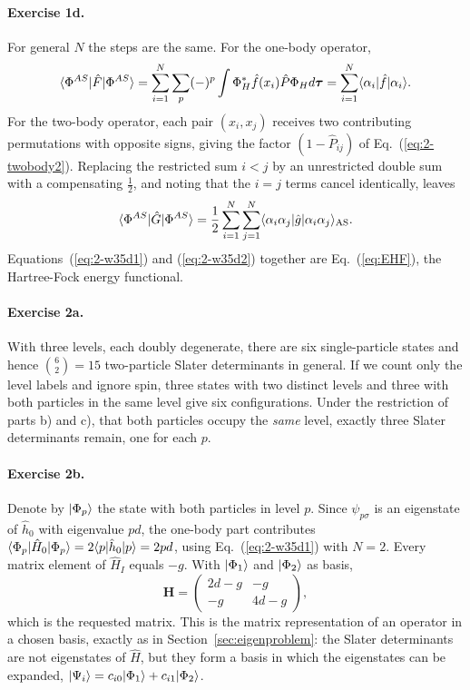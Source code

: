 \paragraph{Exercise 1d.}
For general $N$ the steps are the same.  For the one-body operator,
\begin{equation}
  \langle \Phi^{AS} | \hat{F} | \Phi^{AS} \rangle
   = \sum_{i=1}^{N}\sum_{p}(-)^{p}\int\Phi_H^{*}\hat{f}(x_i)\hat{P}\Phi_H
     d\bm{\tau}
   = \sum_{i=1}^{N}\langle\alpha_i|\hat{f}|\alpha_i\rangle .
  \label{eq:2-w35d1}
\end{equation}
For the two-body operator, each pair $(x_i,x_j)$ receives two contributing
permutations with opposite signs, giving the factor $(1-\hat{P}_{ij})$ of
Eq.~(\ref{eq:2-twobody2}).  Replacing the restricted sum $i<j$ by an
unrestricted double sum with a compensating $\tfrac12$, and noting that the
$i=j$ terms cancel identically, leaves
\begin{equation}
  \langle \Phi^{AS} | \hat{G} | \Phi^{AS} \rangle
   = \frac{1}{2}\sum_{i=1}^{N}\sum_{j=1}^{N}
     \langle\alpha_i\alpha_j|\hat{g}|\alpha_i\alpha_j\rangle_{\mathrm{AS}} .
  \label{eq:2-w35d2}
\end{equation}
Equations~(\ref{eq:2-w35d1}) and (\ref{eq:2-w35d2}) together are
Eq.~(\ref{eq:EHF}), the Hartree-Fock energy functional.

\paragraph{Exercise 2a.}
With three levels, each doubly degenerate, there are six single-particle
states and hence $\binom{6}{2}=15$ two-particle Slater determinants in
general.  If we count only the level labels and ignore spin, three states with
two distinct levels and three with both particles in the same level give six
configurations.  Under the restriction of parts b) and c), that both particles
occupy the \emph{same} level, exactly three Slater determinants remain, one
for each $p$.

\paragraph{Exercise 2b.}
Denote by $\vert \Phi_p \rangle$ the state with both particles in level $p$.  Since
$\psi_{p\sigma}$ is an eigenstate of $\hat{h}_0$ with eigenvalue $pd$, the
one-body part contributes
$\langle \Phi_p | \hat{H}_0 | \Phi_p \rangle=2\langle p|\hat{h}_0|p\rangle=2pd$,
using Eq.~(\ref{eq:2-w35d1}) with $N=2$.  Every matrix element of
$\hat{H}_I$ equals $-g$.  With $\vert \Phi_1 \rangle$ and $\vert \Phi_2 \rangle$ as basis,
\begin{equation}
  \bm{H} =
  \begin{pmatrix} 2d-g & -g\\ -g & 4d-g \end{pmatrix},
  \label{eq:2-w35hmat}
\end{equation}
which is the requested matrix.  This is the matrix representation of an
operator in a chosen basis, exactly as in Section~\ref{sec:eigenproblem}: the
Slater determinants are not eigenstates of $\hat{H}$, but they form a basis in
which the eigenstates can be expanded,
$\vert \Psi_i \rangle=c_{i0}\vert \Phi_1 \rangle+c_{i1}\vert \Phi_2 \rangle$.

